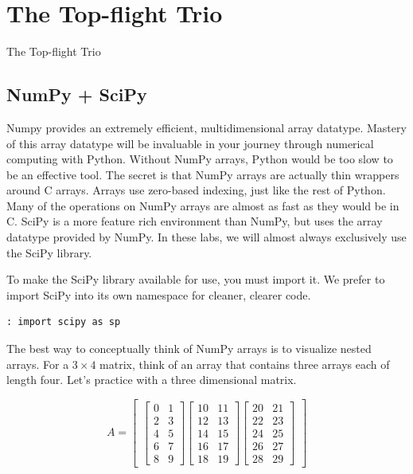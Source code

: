 \chapter{The Top-flight Trio}{The Top-flight Trio}
\label{Lab:PythonAdvanced}

\section*{NumPy + SciPy}
Numpy provides an extremely efficient, multidimensional array datatype.  Mastery of this array datatype will be invaluable in your journey through numerical computing with Python.  Without NumPy arrays, Python would be too slow to be an effective tool.  The secret is that NumPy arrays are actually thin wrappers around C arrays.  Arrays use zero-based indexing, just like the rest of Python.  Many of the operations on NumPy arrays are almost as fast as they would be in C.  SciPy is a more feature rich environment than NumPy, but uses the array datatype provided by NumPy.  In these labs, we will almost always exclusively use the SciPy library.

To make the SciPy library available for use, you must import it.  We prefer to import SciPy into its own namespace for cleaner, clearer code.
\begin{lstlisting}[style=python]
: import scipy as sp
\end{lstlisting}

The best way to conceptually think of NumPy arrays is to visualize nested arrays.  For a $3\times4$ matrix, think of an array that contains three arrays each of length four.  Let's practice with a three dimensional matrix.

\[
A = \begin{bmatrix}
\begin{bmatrix}
0 & 1 \\
2 & 3 \\
4 & 5 \\
6 & 7 \\
8 & 9
\end{bmatrix}
\begin{bmatrix}
10 & 11 \\
12 & 13 \\
14 & 15 \\
16 & 17 \\
18 & 19
\end{bmatrix}
\begin{bmatrix}
20 & 21 \\
22 & 23 \\
24 & 25 \\
26 & 27 \\
28 & 29
\end{bmatrix}
\end{bmatrix}
\]

